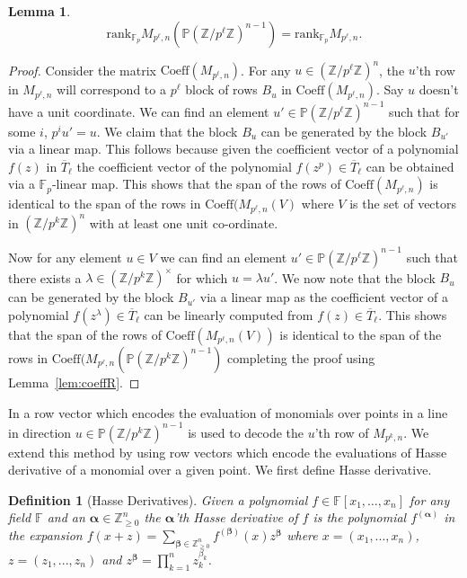 \documentclass[11pt]{article}
\numberwithin{equation}{section}
\newtheorem{lem}[thm]{Lemma}
\newtheorem{define}[thm]{Definition}
\def\F{{\mathbb{F}}}
\def\Z{{\mathbb{Z}}}
\def\P{{\mathbb{P}}}
\def\balpha{{\bm \alpha}}
\def\bbeta{{\bm\beta}}
\def\Coeff{\text{Coeff}}
\begin{document}
\begin{lem}\label{lem:resRk}
{\em $$\text{rank}_{\F_p} M_{p^\ell,n}(\P (\Z/p^\ell\Z)^{n-1}) = \text{rank}_{\F_p} M_{p^\ell,n}.$$}
\end{lem}
\begin{proof}
Consider the matrix $\Coeff(M_{p^\ell,n})$. For any $u\in (\Z/p^\ell\Z)^n$, the $u$'th row in $M_{p^\ell,n}$ will correspond to a $p^\ell$ block of rows $B_u$ in $\Coeff(M_{p^\ell,n})$. 
Say $u$ doesn't have a unit coordinate. We can find an element $u' \in \P (\Z/p^\ell \Z)^{n-1}$ such that for some $i$, $p^iu'=u$. We claim that the block $B_u$ can be generated by the block $B_{u'}$ via a linear map. This follows because given the coefficient vector of a polynomial $f(z)$ in $\overline{T}_{\ell}$ the coefficient vector of the polynomial $f(z^p)\in \overline{T}_\ell$ can be obtained via a $\F_p$-linear map. This shows that the span of the rows of $\Coeff(M_{p^\ell,n})$ is identical to the span of the rows in $\Coeff(M_{p^\ell,n}(V)$ where $V$ is the set of vectors in $(\Z/p^k\Z)^n$ with at least one unit co-ordinate.

Now for any element $u\in V$ we can find an element $u'\in \P (\Z/p^\ell \Z)^{n-1}$ such that there exists a $\lambda \in (\Z/p^k\Z)^\times$ for which $u=\lambda u'$. We now note that the block $B_u$ can be generated by the block $B_{u'}$ via a linear map as the coefficient vector of a polynomial $f(z^{\lambda})\in \overline{T}_{\ell}$ can be linearly computed from $f(z)\in \overline{T}_{\ell}$. This shows that the span of the rows of $\Coeff(M_{p^\ell,n}(V))$ is identical to the span of the rows in $\Coeff(M_{p^\ell,n}(\P (\Z/p^k\Z)^{n-1})$ completing the proof using Lemma~\ref{lem:coeffR}.
\end{proof}

In \cite{arsovski2021padic} a row vector which encodes the evaluation of monomials over points in a line in direction $u\in \P (\Z/p^k\Z)^{n-1}$ is used to decode the $u$'th row of $M_{p^k,n}$. We extend this method by using row vectors which encode the evaluations of Hasse derivative of a monomial over a given point. We first define Hasse derivative.

\begin{define}[Hasse Derivatives]
Given a polynomial $f\in \F[x_1,\hdots,x_n]$ for any field $\F$ and an $\balpha\in \Z_{\ge 0}^n$ the $\balpha$'th {\em Hasse derivative} of $f$ is the polynomial $f^{(\balpha)}$ in the expansion $f(x+z)=\sum_{\bbeta\in \Z_{\ge 0}^n} f^{(\bbeta)}(x)z^{\bbeta}$ where $x=(x_1,...,x_n)$, $z=(z_1,...,z_n)$ and $z^{\bbeta}=\prod_{k=1}^n z_k^{\beta_k}$.  
\end{define}
\end{document}
